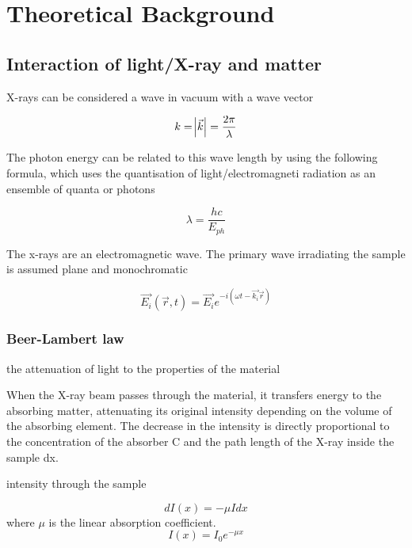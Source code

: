 \chapter{Theoretical Background}
\label{chap:theory_SAXS}

\section{Interaction of light/X-ray and matter}

X-rays can be considered a wave in vacuum with a wave vector 

\begin{equation}
        k=\abs{\vec{k}} = \frac{2\pi}{\lambda}
\end{equation}

The photon energy can be related to this wave length by using the following formula, which uses the quantisation of light/electromagneti radiation as an ensemble of quanta or photons

\begin{equation}
        \lambda = \frac{h c}{E_{ph}}
\end{equation}

The x-rays are an electromagnetic wave. The primary wave irradiating the sample is assumed plane and monochromatic

\begin{equation}
        \vec{E_i}\left( \vec{r},t \right)=\vec{E_i}e^{-i\left( \omega t - \vec{k_i}\vec{r} \right)}
\end{equation}

\subsection{Beer-Lambert law}
\label{sec:BeerLambert}

the attenuation of light to the properties of the material 

When the X-ray beam passes through the material, it transfers energy to the absorbing matter, attenuating its original intensity depending on the volume of the absorbing element. The decrease in the intensity is directly proportional to the concentration of the absorber C and the path length of the X-ray inside the sample dx.

intensity through the sample

\begin{equation}
        dI\left( x \right)=-\mu I dx
\end{equation}
where $\mu$ is the linear absorption coefficient.
\begin{equation}
        I\left( x \right)=I_0e^{-\mu x}
\end{equation}

